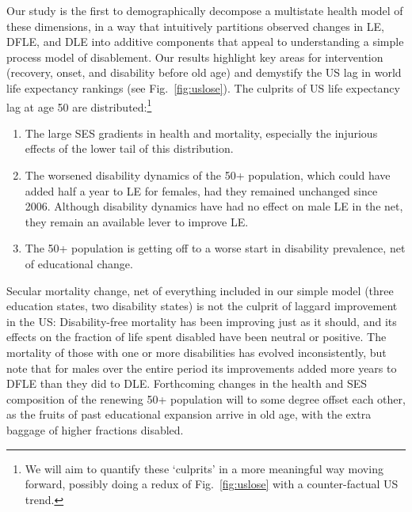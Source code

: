 Our study is the first to demographically decompose a multistate health model of these dimensions, in a way that intuitively partitions observed changes in LE, DFLE, and DLE into additive components that appeal to understanding a simple process model of disablement. Our results highlight key areas for intervention (recovery, onset, and disability before old age) and demystify the US lag in world life expectancy rankings (see Fig.~\ref{fig:uslose}). The culprits of US life expectancy lag at age 50 are distributed:\footnote{ We will aim to quantify these `culprits' in a more meaningful way moving forward, possibly doing a redux of Fig.~\ref{fig:uslose} with a counter-factual US trend.}

\begin{enumerate}
\item The large SES gradients in health and mortality, especially the injurious effects of the lower tail of this distribution.
\item The worsened disability dynamics of the 50+ population, which could have added half a year to LE for females, had they remained unchanged since 2006. Although disability dynamics have had no effect on male LE in the net, they remain an available lever to improve LE.
\item The 50+ population is getting off to a worse start in disability prevalence, net of educational change.
\end{enumerate}

Secular mortality change, net of everything included in our simple model (three education states, two disability states) is not the culprit of laggard improvement in the US: Disability-free mortality has been improving just as it should, and its effects on the fraction of life spent disabled have been neutral or positive. The mortality of those with one or more disabilities has evolved inconsistently, but note that for males over the entire period its improvements added more years to DFLE than they did to DLE. Forthcoming changes in the health and SES composition of the renewing 50+ population will to some degree offset each other, as the fruits of past educational expansion arrive in old age, with the extra baggage of higher fractions disabled.

